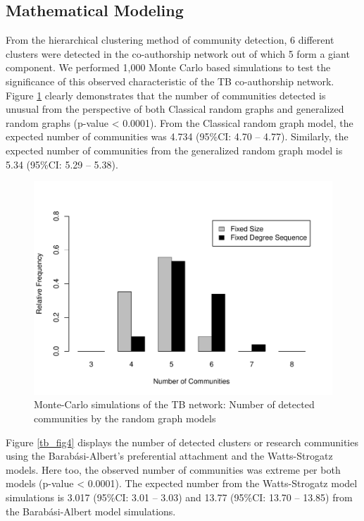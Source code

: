 \subsection{Mathematical Modeling}
From the hierarchical clustering method of community detection, 6 different clusters were detected in the co-authorship network out of which 5 form a giant component. We performed 1,000 Monte Carlo based simulations to test the significance of this observed characteristic of the TB co-authorship network. Figure \ref{tb_fig3} clearly demonstrates that the number of communities detected is unusual from the perspective of both Classical random graphs and generalized random graphs (p-value < 0.0001). From the Classical random graph model, the expected number of communities was 4.734 (95\%CI: 4.70 -- 4.77). Similarly, the expected number of communities from the generalized random graph model is 5.34 (95\%CI: 5.29 -- 5.38).

\begin{figure}[h!]
\centering
\includegraphics[scale=0.65]{Chapters/tb/randomComm}
\caption{Monte-Carlo simulations of the TB network: Number of detected communities by the random graph models}
\label{tb_fig3}
\end{figure}

Figure \ref{tb_fig4} displays the number of detected clusters or research communities using the Barab\'asi-Albert's preferential attachment and the Watts-Strogatz models. Here too, the observed number of communities was extreme per both models (p-value < 0.0001). The expected number from the Watts-Strogatz model simulations is 3.017 (95\%CI: 3.01 -- 3.03) and 13.77 (95\%CI: 13.70 -- 13.85) from the Barab\'asi-Albert model simulations. 

